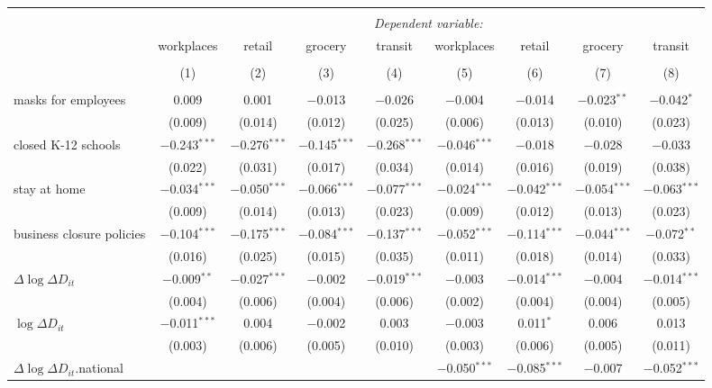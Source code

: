 \begin{tabular}{@{\extracolsep{1pt}}lcccccccc} 
\\[-1.8ex]\hline 
\hline \\[-1.8ex] 
 & \multicolumn{8}{c}{\textit{Dependent variable:}} \\ 
\cline{2-9} 
 & workplaces & retail & grocery & transit & workplaces & retail & grocery & transit \\ 
\\[-1.8ex] & (1) & (2) & (3) & (4) & (5) & (6) & (7) & (8)\\ 
\hline \\[-1.8ex] 
 masks for employees & 0.009 & 0.001 & $-$0.013 & $-$0.026 & $-$0.004 & $-$0.014 & $-$0.023$^{**}$ & $-$0.042$^{*}$ \\ 
  & (0.009) & (0.014) & (0.012) & (0.025) & (0.006) & (0.013) & (0.010) & (0.023) \\ 
  closed K-12 schools & $-$0.243$^{***}$ & $-$0.276$^{***}$ & $-$0.145$^{***}$ & $-$0.268$^{***}$ & $-$0.046$^{***}$ & $-$0.018 & $-$0.028 & $-$0.033 \\ 
  & (0.022) & (0.031) & (0.017) & (0.034) & (0.014) & (0.016) & (0.019) & (0.038) \\ 
  stay at home & $-$0.034$^{***}$ & $-$0.050$^{***}$ & $-$0.066$^{***}$ & $-$0.077$^{***}$ & $-$0.024$^{***}$ & $-$0.042$^{***}$ & $-$0.054$^{***}$ & $-$0.063$^{***}$ \\ 
  & (0.009) & (0.014) & (0.013) & (0.023) & (0.009) & (0.012) & (0.013) & (0.023) \\ 
  business closure policies & $-$0.104$^{***}$ & $-$0.175$^{***}$ & $-$0.084$^{***}$ & $-$0.137$^{***}$ & $-$0.052$^{***}$ & $-$0.114$^{***}$ & $-$0.044$^{***}$ & $-$0.072$^{**}$ \\ 
  & (0.016) & (0.025) & (0.015) & (0.035) & (0.011) & (0.018) & (0.014) & (0.033) \\ 
  $\Delta \log \Delta D_{it}$ & $-$0.009$^{**}$ & $-$0.027$^{***}$ & $-$0.002 & $-$0.019$^{***}$ & $-$0.003 & $-$0.014$^{***}$ & $-$0.004 & $-$0.014$^{***}$ \\ 
  & (0.004) & (0.006) & (0.004) & (0.006) & (0.002) & (0.004) & (0.004) & (0.005) \\ 
  $\log \Delta D_{it}$ & $-$0.011$^{***}$ & 0.004 & $-$0.002 & 0.003 & $-$0.003 & 0.011$^{*}$ & 0.006 & 0.013 \\ 
  & (0.003) & (0.006) & (0.005) & (0.010) & (0.003) & (0.006) & (0.005) & (0.011) \\ 
  $\Delta \log \Delta D_{it}$.national &  &  &  &  & $-$0.050$^{***}$ & $-$0.085$^{***}$ & $-$0.007 & $-$0.052$^{***}$ \\ 

\end{tabular}
